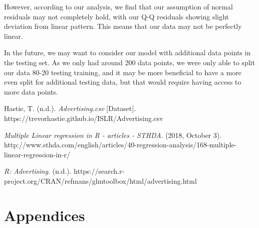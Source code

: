 \documentclass{article}
\begin{document}
However, according to our analysis, we find that our assumption of normal residuals may not completely hold, with our Q-Q residuals showing slight deviation from linear pattern. This means that our data may not be perfectly linear. 

In the future, we may want to consider our model with additional data points in the testing set. As we only had around 200 data points, we were only able to split our data 80-20 testing training, and it may be more beneficial to have a more even split for additional testing data, but that would require having access to more data points.

\begin{thebibliography}{9}

Hastie, T. (n.d.). \emph{Advertising.csv} [Dataset]. https://trevorhastie.github.io/ISLR/Advertising.csv

\emph{Multiple Linear regression in R - articles - STHDA}. (2018, October 3). http://www.sthda.com/english/articles/40-regression-analysis/168-multiple-linear-regression-in-r/


\emph{R: Advertising}. (n.d.). https://search.r-project.org/CRAN/refmans/glmtoolbox/html/advertising.html


\end{thebibliography}

\section{Appendices}
\end{document}
